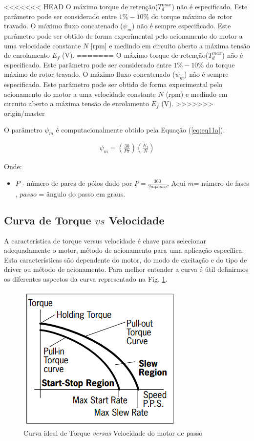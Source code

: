 <<<<<<< HEAD
O máximo torque de retenção($T_d^{max}$) não é especificado. Este parâmetro pode  ser considerado entre $1\%-10\%$ do torque máximo de rotor travado. O máximo fluxo concatenado ($\psi_m$) não é sempre especificado. Este parâmetro pode ser obtido de forma experimental pelo acionamento do motor a uma velocidade constante $N$ [rpm] e medindo em circuito aberto a máxima tensão de enrolamento $E_f$ (V).
=======
O máximo torque de retenção($T_d^{max}$) não é especificado. Este parâmetro pode  ser considerado entre $1\%-10\%$ do torque máximo de rotor travado. O máximo fluxo concatenado ($\psi_m$) não é sempre especificado. Este parâmetro pode ser obtido de forma experimental pelo acionamento do motor a uma velocidade constante $N$ (rpm) e medindo em circuito aberto a máxima tensão de enrolamento $E_f$ (V).
>>>>>>> origin/master

O parâmetro $\psi_m$ é computacionalmente obtido pela Equação (\ref{eq:eq11a}).

\begin{eqnarray}
\label{eq:eq11a}
\psi_m = \left(\frac{30}{P \pi}\right) \left(\frac{E_f}{N}\right)
\end{eqnarray}

Onde:

\begin{itemize}
	\item $P$ - número de pares de pólos dado por $P = \frac{360}{2mpasso}$. Aqui $m$= número de fases , $passo$ = ângulo do passo em graus.
\end{itemize}

\subsection{Curva de Torque $vs$ Velocidade}
A característica de torque versus velocidade é chave para selecionar adequadamente o motor, método de acionamento para uma aplicação específica. Esta características são dependente do motor, do modo de excitação e do tipo de driver ou método de acionamento. Para melhor entender a curva é útil definirmos os diferentes aspectos da curva representado na Fig. \ref{fig:fig3}.

\begin{figure}[H]
	\centering
	\includegraphics[scale=.6]{Images/curvatorquevelocidade_HSM.PNG}
	\caption{ Curva ideal de Torque \textit{versus} Velocidade do motor de passo }
	\label{fig:fig3}
\end{figure}

